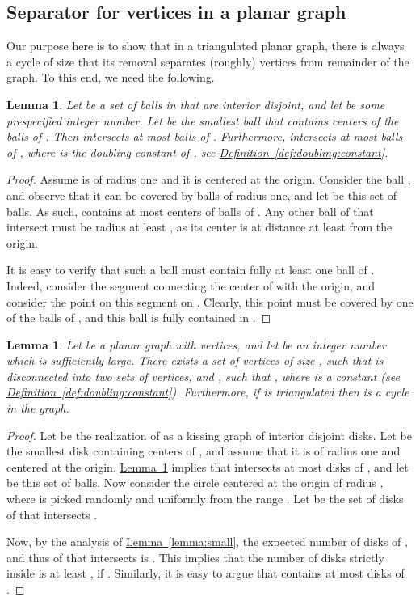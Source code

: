 \documentclass[12pt]{article}
\newtheorem{lemma}[theorem]{Lemma}
\theoremstyle{remark}\theoremheaderfont{\sf}\theorembodyfont{\upshape}\newtheorem{defn}[theorem]{Definition}
\newcommand{\HLink}[2]{\hyperref[#2]{#1~\ref*{#2}}}
\newcommand{\lemlab}[1]{\label{lemma:#1}}
\newcommand{\lemref}[1]{\HLink{Lemma}{lemma:#1}}
\newcommand{\defref}[1]{\HLink{Definition}{def:#1}}
\begin{document}
\subsection{Separator for  vertices in a planar graph}

Our purpose here is to show that in a triangulated planar graph, there
is always a cycle of size  that its removal separates
(roughly)  vertices from remainder of the graph. To this end, we
need the following.

\begin{lemma}\lemlab{packing:r}Let  be a set of  balls in  that are interior
    disjoint, and let  be some prespecified integer number.
    Let  be the smallest ball that contains  centers of the
    balls of . Then  intersects at most
     balls of . Furthermore,
     intersects at most 
    balls of , where  is the doubling constant of
    , see \defref{doubling:constant}.
\end{lemma}
\begin{proof}
    Assume  is of radius one and it is centered at the
    origin. Consider the ball , and observe that it can be
    covered by  balls of radius one, and let
     be this set of balls. As such,  contains at
    most  centers of balls of . Any
    other ball of  that intersect  must be radius at
    least , as its center is at distance at least  from the
    origin.

    It is easy to verify that such a ball  must contain fully
    at least one ball of . Indeed, consider the segment
    connecting the center of  with the origin, and consider
    the point on this segment on . Clearly, this
    point must be covered by one of the balls of , and this
    ball is fully contained in .
\end{proof}

\begin{lemma}
    Let  be a planar graph with  vertices, and let 
    be an integer number which is sufficiently large. There exists a
    set of vertices  of size ,
    such that  is disconnected into two sets
    of vertices,  and , such that , where  is a constant (see
    \defref{doubling:constant}).  Furthermore, if  is
    triangulated then  is a cycle in the graph.
\end{lemma}

\begin{proof}
    Let  be the realization of  as a kissing graph
    of interior disjoint disks.  Let  be the smallest disk
    containing  centers of , and assume that
    it is of radius one and centered at the origin.
    \lemref{packing:r} implies that  intersects at most
     disks of , and let 
    be this set of balls. Now consider the circle  centered at
    the origin of radius , where  is picked randomly and
    uniformly from the range . Let  be the set of
    disks of  that intersects . 

    Now, by the analysis of \lemref{small}, the expected number of
    disks of , and thus of  that intersects 
    is
    .
    This implies that the number of disks strictly inside  is at
    least
    , if
    . Similarly, it is easy to argue
    that  contains at most  disks of .
\end{proof}
\end{document}
